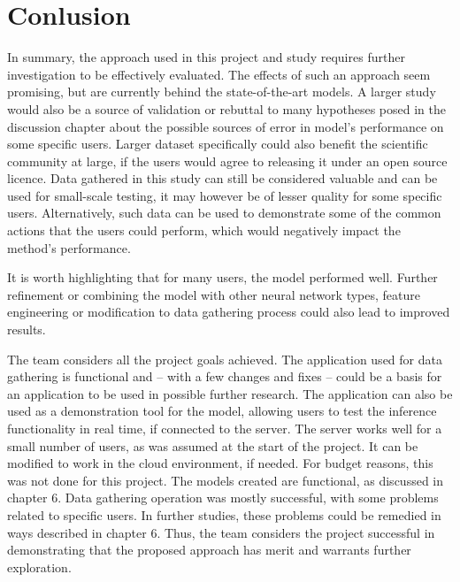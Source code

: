 
\chapter{Conlusion}

In summary, the approach used in this project and study requires further investigation to be effectively evaluated. The effects of such an approach seem promising, but are currently behind the state-of-the-art models. A larger study would also be a source of validation or rebuttal to many hypotheses posed in the discussion chapter about the possible sources of error in model's performance on some specific users. Larger dataset specifically could also benefit the scientific community at large, if the users would agree to releasing it under an open source licence. Data gathered in this study can still be considered valuable and can be used for small-scale testing, it may however be of lesser quality for some specific users. Alternatively, such data can be used to demonstrate some of the common actions that the users could perform, which would negatively impact the method's performance.

It is worth highlighting that for many users, the model performed well. Further refinement or combining the model with other neural network types, feature engineering or modification to data gathering process could also lead to improved results.

The team considers all the project goals achieved. The application used for data gathering is functional and -- with a few changes and fixes -- could be a basis for an application to be used in possible further research. The application can also be used as a demonstration tool for the model, allowing users to test the inference functionality in real time, if connected to the server. The server works well for a small number of users, as was assumed at the start of the project. It can be modified to work in the cloud environment, if needed. For budget reasons, this was not done for this project. The models created are functional, as discussed in chapter 6. Data gathering operation was mostly successful, with some problems related to specific users. In further studies, these problems could be remedied in ways described in chapter 6. Thus, the team considers the project successful in demonstrating that the proposed approach has merit and warrants further exploration.